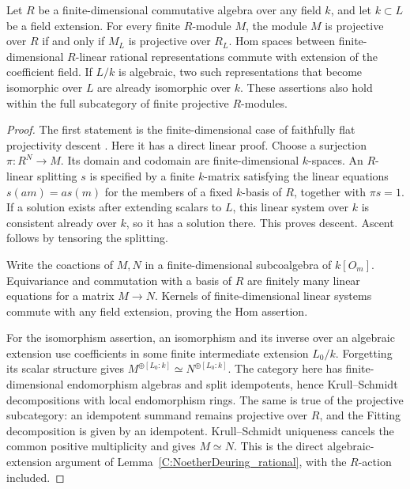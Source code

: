 \begin{lemma}
\label{C:finite-algebra-projectivity-descent}
Let $R$ be a finite-dimensional commutative algebra over any field
$k$, and let $k\subset L$ be a field extension.
For every finite $R$-module $M$, the module $M$ is projective over
$R$ if and only if $M_L$ is projective over $R_L$.
Hom spaces between finite-dimensional $R$-linear rational
representations commute with extension of the coefficient field.
If $L/k$ is algebraic, two such representations that become
isomorphic over $L$ are already isomorphic over $k$.
These assertions also hold within the full subcategory of finite
projective $R$-modules.
\end{lemma}
\begin{proof}
The first statement is the finite-dimensional case of faithfully
flat projectivity descent
\cite[Proposition 10.83.3, Tag 058S]{C-StacksArtinianPerfect}.
Here it has a direct linear proof. Choose a surjection
$\pi:R^N\to M$. Its domain and codomain are finite-dimensional
$k$-spaces. An $R$-linear splitting $s$ is specified by a finite
$k$-matrix satisfying the linear equations
$s(am)=a s(m)$ for the members of a fixed $k$-basis of $R$,
together with $\pi s=1$. If a solution exists after extending
scalars to $L$, this linear system over $k$ is consistent already
over $k$, so it has a solution there. This proves descent.
Ascent follows by tensoring the splitting.

Write the coactions of $M,N$ in a finite-dimensional subcoalgebra
of $k[O_m]$. Equivariance and commutation with a basis of $R$
are finitely many linear equations for a matrix $M\to N$.
Kernels of finite-dimensional linear systems commute with any
field extension, proving the Hom assertion.

For the isomorphism assertion, an isomorphism and its inverse
over an algebraic extension use coefficients in some finite
intermediate extension $L_0/k$. Forgetting its scalar structure
gives
$M^{\oplus[L_0:k]}\simeq N^{\oplus[L_0:k]}$.
The category here has finite-dimensional endomorphism algebras
and split idempotents, hence Krull--Schmidt decompositions with
local endomorphism rings. The same is true of the projective
subcategory: an idempotent summand remains projective over $R$,
and the Fitting decomposition is given by an idempotent.
Krull--Schmidt uniqueness cancels the common positive
multiplicity and gives $M\simeq N$.
This is the direct algebraic-extension argument of
Lemma~\ref{C:NoetherDeuring_rational}, with the $R$-action included.
\end{proof}

